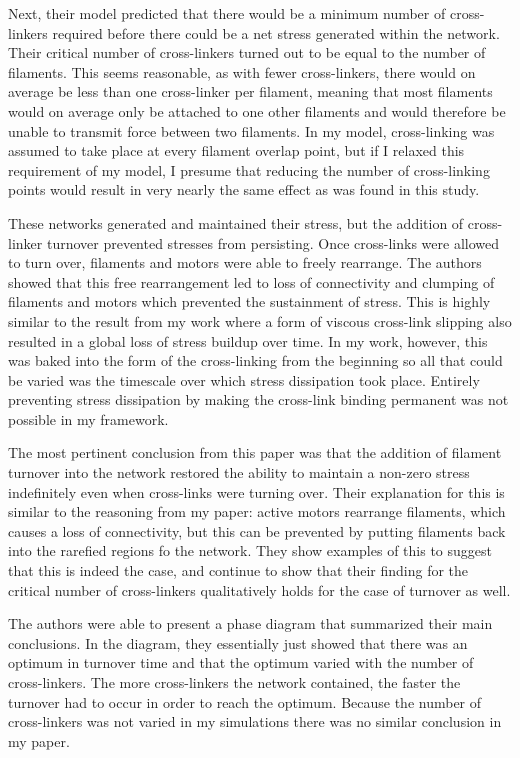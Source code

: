 Next, their model predicted that there would be a minimum number of cross-linkers required before there could be a net stress generated within the network.  Their critical number of cross-linkers turned out to be equal to the number of filaments.  This seems reasonable, as with fewer cross-linkers, there would on average be less than one cross-linker per filament, meaning that most filaments would on average only be attached to one other filaments and would therefore be unable to transmit force between two filaments.  In my model, cross-linking was assumed to take place at every filament overlap point, but if I relaxed this requirement of my model, I presume that reducing the number of cross-linking points would result in very nearly the same effect as was found in this study.  

These networks generated and maintained their stress, but the addition of cross-linker turnover prevented stresses from persisting.  Once cross-links were allowed to turn over, filaments and motors were able to freely rearrange.  The authors showed that this free rearrangement led to loss of connectivity and clumping of filaments and motors which prevented the sustainment of stress.  This is highly similar to the result from my work where a form of viscous cross-link slipping also resulted in a global loss of stress buildup over time.  In my work, however, this was baked into the form of the cross-linking from the beginning so all that could be varied was the timescale over which stress dissipation took place.  Entirely preventing stress dissipation by making the cross-link binding permanent was not possible in my framework.

The most pertinent conclusion from this paper was that the addition of filament turnover into the network restored the ability to maintain a non-zero stress indefinitely even when cross-links were turning over.  Their explanation for this is similar to the reasoning from my paper: active motors rearrange filaments, which causes a loss of connectivity, but this can be prevented by putting filaments back into the rarefied regions fo the network. They show examples of this to suggest that this is indeed the case, and continue to show that their finding for the critical number of cross-linkers qualitatively holds for the case of turnover as well.

The authors were able to present a phase diagram that summarized their main conclusions.  In the diagram, they essentially just showed that there was an optimum in turnover time and that the optimum varied with the number of cross-linkers.  The more cross-linkers the network contained, the faster the turnover had to occur in order to reach the optimum.  Because the number of cross-linkers was not varied in my simulations there was no similar conclusion in my paper.

